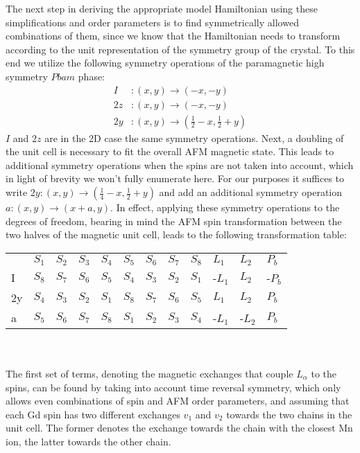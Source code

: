 The next step in deriving the appropriate model Hamiltonian using these simplifications and order parameters is to find symmetrically allowed combinations of them, since we know that the Hamiltonian needs to transform according to the unit representation of the symmetry group of the crystal.
To this end we utilize the following symmetry operations of the paramagnetic high symmetry $Pbam$ phase:
\begin{align}
	I &: (x, y) \rightarrow (-x, -y)\\
	2z &: (x, y) \rightarrow (-x, -y)\\
	2y &: (x, y) \rightarrow (\frac{1}{2} - x, \frac{1}{2} + y)
\end{align}
$I$ and $2z$ are in the 2D case the same symmetry operations. Next, a doubling of the unit cell is necessary to fit the overall AFM magnetic state. This leads to additional symmetry operations when the spins are not taken into account, which in light of brevity we won't fully enumerate here. For our purposes it suffices to write $2y: (x, y) \rightarrow (\frac{1}{4} - x, \frac{1}{2}+y)$ and add an additional symmetry operation $a: (x, y) \rightarrow (x + a, y)$.
In effect, applying these symmetry operations to the degrees of freedom, bearing in mind the AFM spin transformation between the two halves of the magnetic unit cell, leads to the following transformation table:
\begin{table}[h]
\begin{tabular}{|l|lllllllllll|}
\cline{1-12}
 & $S_1$ & $S_2$ & $S_3$ & $S_4$ & $S_5$ & $S_6$ & $S_7$ & $S_8$ & $L_1$ & $L_2$ & $P_b$ \\ \cline{1-12}
I & $S_8$ & $S_7$ & $S_6$ & $S_5$ & $S_4$ & $S_3$ & $S_2$ & $S_1$ & -$L_1$ & $L_2$ & -$P_b$ \\ \cline{1-12}
2y & $S_4$ & $S_3$ & $S_2$ & $S_1$ & $S_8$ & $S_7$ & $S_6$ & $S_5$ & $L_1$ & $L_2$ & $P_b$ \\ \cline{1-12}
a & $S_5$ & $S_6$ & $S_7$ & $S_8$ & $S_1$ & $S_2$ & $S_3$ & $S_4$ & -$L_1$ & -$L_2$ & $P_b$ \\ \cline{1-12}
\end{tabular}
\end{table}\\\\
The first set of terms, denoting the magnetic exchanges that couple $L_\alpha$ to the spins, can be found by taking into account time reversal symmetry, which only allows even combinations of spin and AFM order parameters, and assuming that each Gd spin has two different exchanges $v_1$ and $v_2$ towards the two chains in the unit cell. The former denotes the exchange towards the chain with the closest Mn ion, the latter towards the other chain.
